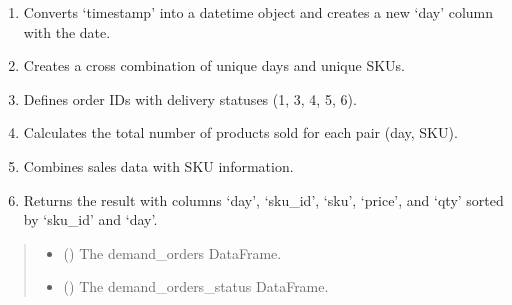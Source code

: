 \documentclass[letterpaper,10pt,english]{sphinxmanual}
\begin{document}
\begin{fulllineitems}
\label{\detokenize{src_demand_forecast.features:src_demand_forecast.features.build_sku_by_day.sku_demand_by_day}}
\pysigstartsignatures
{}
\pysigstopsignatures\begin{description}
\begin{enumerate}
%
\item {} 
\sphinxAtStartPar
Converts ‘timestamp’ into a datetime object and creates a new ‘day’ column with the date.

\item {} 
\sphinxAtStartPar
Creates a cross combination of unique days and unique SKUs.

\item {} 
\sphinxAtStartPar
Defines order IDs with delivery statuses (1, 3, 4, 5, 6).

\item {} 
\sphinxAtStartPar
Calculates the total number of products sold for each pair (day, SKU).

\item {} 
\sphinxAtStartPar
Combines sales data with SKU information.

\item {} 
\sphinxAtStartPar
Returns the result with columns ‘day’, ‘sku\_id’, ‘sku’, ‘price’, and ‘qty’ sorted by ‘sku\_id’ and ‘day’.

\end{enumerate}

\end{description}
\begin{quote}\begin{description}
\begin{itemize}
\item {} 
\sphinxAtStartPar
{} () \textendash{} The demand\_orders DataFrame.

\item {} 
\sphinxAtStartPar
{} () \textendash{} The demand\_orders\_status DataFrame.


\end{itemize}
\end{description}
\end{quote}
\end{fulllineitems}
\end{document}
